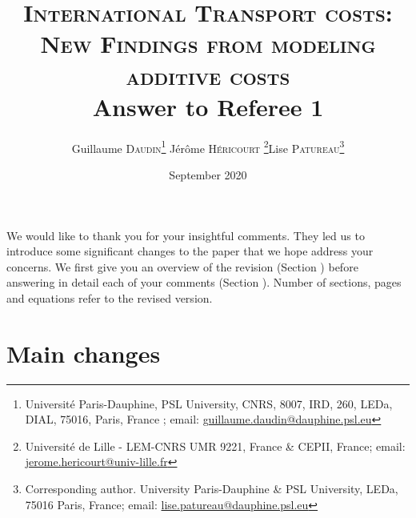 \documentclass[a4paper,12pt]{article}
\begin{document}
\title{\textsc{International Transport costs:\\New Findings from modeling additive costs} \\
Answer to Referee 1}

\author{Guillaume \textsc{Daudin}\thanks{%
Université Paris-Dauphine, PSL University, CNRS, 8007, IRD, 260, LEDa, DIAL, 75016, Paris, France ; email: \url{guillaume.daudin@dauphine.psl.eu}}  \qquad J\'{e}r\^{o}me \textsc{H\'{e}ricourt} \thanks{Universit\'{e} de Lille - LEM-CNRS UMR 9221, France \& CEPII, France; email: \url{jerome.hericourt@univ-lille.fr}}\qquad Lise \textsc{Patureau}\thanks{Corresponding author.
University Paris-Dauphine \& PSL University, LEDa, 75016 Paris, France;  email: \url{lise.patureau@dauphine.psl.eu} } }


\date{September 2020}
 \maketitle
\bigskip

We would like to thank you for your insightful comments. They led us to introduce some
significant changes to the paper that we hope address your concerns. We first give you an overview
of the revision (Section ) before answering in detail each of your comments (Section ). Number of sections, pages and
equations refer to the revised version.

\section{Main changes \label{sec:main_changes}}
\end{document}
